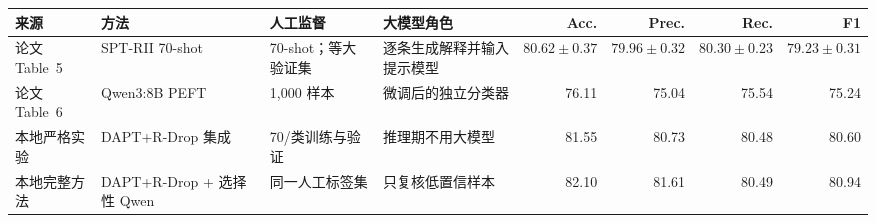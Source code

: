 \begin{tabularx}{\textwidth}{p{1.55cm}p{2.75cm}p{2.35cm}Xrrrr}
\toprule
来源 & 方法 & 人工监督 & 大模型角色 & Acc. & Prec. & Rec. & F1 \\
\midrule
论文 Table~5 & SPT-RII 70-shot & 70-shot；等大验证集 & 逐条生成解释并输入提示模型 & $80.62\pm0.37$ & $79.96\pm0.32$ & $80.30\pm0.23$ & $79.23\pm0.31$ \\
论文 Table~6 & Qwen3:8B PEFT & 1,000 样本 & 微调后的独立分类器 & 76.11 & 75.04 & 75.54 & 75.24 \\
本地严格实验 & DAPT+R-Drop 集成 & 70/类训练与验证 & 推理期不用大模型 & 81.55 & 80.73 & 80.48 & 80.60\\
\rowcolor{LightGreen}本地完整方法 & DAPT+R-Drop + 选择性 Qwen & 同一人工标签集 & 只复核低置信样本 & 82.10 & 81.61 & 80.49 & 80.94\\
\bottomrule
\end{tabularx}
